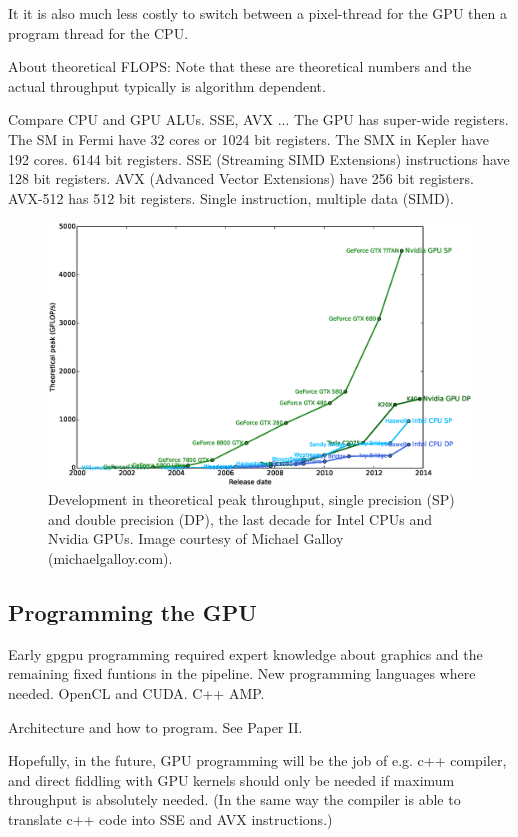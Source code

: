 It it is also much less costly to switch between a pixel-thread for the GPU then a program thread for the CPU.  

About theoretical FLOPS: Note that these are theoretical numbers and the actual throughput typically is algorithm dependent.

Compare CPU and GPU ALUs. SSE, AVX ... The GPU has super-wide registers. The SM in Fermi have 32 cores or 1024 bit registers. The SMX in Kepler have 192 cores. 6144 bit registers. SSE (Streaming SIMD Extensions) instructions have 128 bit registers. AVX (Advanced Vector Extensions) have 256 bit registers. AVX-512 has 512 bit registers. Single instruction, multiple data (SIMD).

\begin{figure}
\centering
\includegraphics[width=\textwidth]{img/cpu-vs-gpu.eps}
\caption{Development in theoretical peak throughput, single precision (SP) and double precision (DP), the last decade for Intel CPUs and Nvidia GPUs. Image courtesy of Michael Galloy (michaelgalloy.com).}
\label{fig:cpu_vs_gpu}
\end{figure}

\subsection{Programming the GPU}
Early gpgpu programming required expert knowledge about graphics and the remaining fixed funtions in the pipeline. New programming languages where needed. OpenCL and CUDA. C++ AMP.

Architecture and how to program. See Paper II.

Hopefully, in the future, GPU programming will be the job of e.g. c++ compiler, and direct fiddling with GPU kernels should only be needed if maximum throughput is absolutely needed. (In the same way the compiler is able to translate c++ code into SSE and AVX instructions.)

